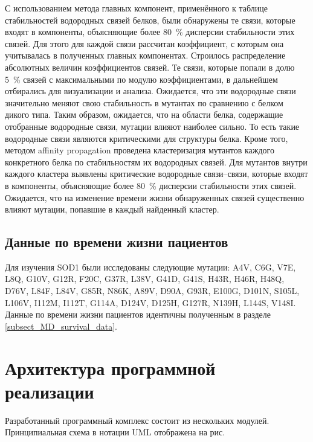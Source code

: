 С использованием метода главных компонент, применённого к таблице стабильностей водородных связей белков, были обнаружены те связи, которые входят в компоненты, объясняющие более 80~\% дисперсии стабильности этих связей. Для этого для каждой связи рассчитан коэффициент, с которым она учитывалась в полученных главных компонентах. Строилось распределение абсолютных величин коэффициентов связей. Те связи, которые попали в долю 5~\% связей с максимальными по модулю коэффициентами, в дальнейшем отбирались для визуализации и анализа. Ожидается, что эти водородные связи значительно меняют свою стабильность в мутантах по сравнению с белком дикого типа. Таким образом, ожидается, что на области белка, содержащие отобранные водородные связи, мутации влияют наиболее сильно. То есть такие водородные связи являются критическими для структуры белка. 
Кроме того, методом affinity propagation \cite{Frey2007} проведена кластеризация мутантов каждого конкретного белка по стабильностям их водородных связей. Для мутантов внутри каждого кластера выявлены критические водородные связи--связи, которые входят в компоненты, объясняющие более 80~\% дисперсии стабильности этих связей. Ожидается, что на изменение времени жизни обнаруженных связей существенно влияют мутации, попавшие в каждый найденный кластер.

\subsection{Данные по времени жизни пациентов} \label{subsect_EN_survival_data}

Для изучения SOD1 были исследованы следующие мутации: A4V, C6G, V7E, L8Q, G10V, G12R, F20C, G37R, L38V, G41D, G41S, H43R, H46R, H48Q, D76V, L84F, L84V, G85R, N86K, A89V, D90A, G93R, E100G, D101N, S105L, L106V, I112M, I112T, G114A, D124V, D125H, G127R, N139H, L144S, V148I. Данные по времени жизни пациентов идентичны полученным в разделе \ref{subsect_MD_survival_data}.

\section{Архитектура программной реализации} \label{sect_architecture}

Разработанный программный комплекс состоит из нескольких модулей. Принципиальная схема в нотации UML отображена на рис.